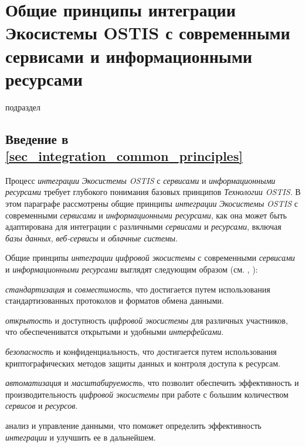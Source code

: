 \section{Общие принципы интеграции Экосистемы OSTIS с современными сервисами и информационными ресурсами}
{\label{sec_integration_common_principles}}

\begin{SCn}
    
    \begin{scnrelfromlist}{подраздел}
    \end{scnrelfromlist}
    
\end{SCn}

\subsection*{Введение в \ref{sec_integration_common_principles}}

Процесс \textit{интеграции} \textit{Экосистемы OSTIS} с \textit{сервисами} и \textit{информационными ресурсами} требует глубокого понимания базовых принципов \textit{Технологии OSTIS}. 
В этом параграфе рассмотрены общие принципы \textit{интеграции} \textit{Экосистемы OSTIS} с современными \textit{сервисами} и \textit{информационными ресурсами}, как она может быть адаптирована для интеграции с различными \textit{сервисами} и \textit{ресурсами}, включая \textit{базы данных}, \textit{веб-сервисы} и \textit{облачные системы}.

Общие принципы \textit{интеграции} \textit{цифровой экосистемы} с современными \textit{сервисами} и \textit{информационными ресурсами} выглядят следующим образом (см. , ):
\begin{textitemize}
    \item \textit{стандартизация} и \textit{совместимость}, что достигается путем использования стандартизованных протоколов и форматов обмена данными.
    \item \textit{открытость} и доступность \textit{цифровой экосистемы} для различных участников, что обеспечениватся открытыми и удобными \textit{интерфейсами}.
    \item \textit{безопасность} и конфиденциальность, что достигается путем использования криптографических методов защиты данных и контроля доступа к ресурсам.
    \item \textit{автоматизация} и \textit{масштабируемость}, что позволит обеспечить эффективность и производительность \textit{цифровой экосистемы} при работе с большим количеством \textit{сервисов} и \textit{ресурсов}.
    \item анализ и управление данными, что поможет определить эффективность \textit{интеграции} и улучшить ее в дальнейшем.
\end{textitemize}

